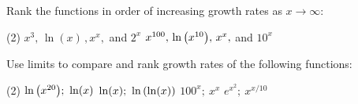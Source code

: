 \documentclass[mathNotesPreamble]{subfiles}
\begin{document}
\vspace*{5pt}

\noindent
{}
\begin{ex*}
  Rank the functions in order of increasing growth rates as $x\to\infty$:
\end{ex*}
\begin{tasks}[after-item-skip=\stretch{1}, label=~](2)
  \task $x^3,\,\ln(x)\,,x^x,$ and $2^x$
  \task $x^{100},\,\ln{\left(x^{10}\right)},\,x^x,$ and $10^x$
\end{tasks}

\begin{ex*}
  Use limits to compare and rank growth rates of the following functions:
\end{ex*}
\begin{tasks}[after-item-skip=\stretch{1}, label=~](2)
  \task $\ln{\left(x^{20}\right)};\ \ln(x)$
  \task $\ln(x);\ \ln{\left(\ln(x)\right)}$
  \task $100^x;\ x^x$
  \task $e^{x^2};\ x^{x/10}$
\end{tasks}
\pagebreak
\end{document}
